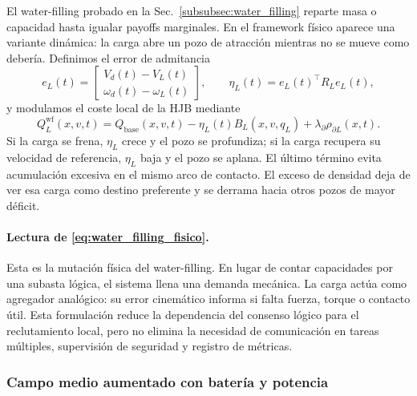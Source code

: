 El water-filling probado en la Sec.~\ref{subsubsec:water_filling} reparte masa o
capacidad hasta igualar payoffs marginales. En el framework físico aparece una variante
dinámica: la carga abre un pozo de atracción mientras no se mueve como debería. Definimos
el error de admitancia
\begin{equation}
  e_L(t)=
  \begin{bmatrix}
    V_d(t)-V_L(t)\\
    \omega_d(t)-\omega_L(t)
  \end{bmatrix},
  \qquad
  \eta_L(t)=e_L(t)^\top R_L e_L(t),
  \label{eq:error_admitancia_water}
\end{equation}
y modulamos el coste local de la HJB mediante
\begin{equation}
  Q_L^{\mathrm{wf}}(x,v,t)
  =
  Q_{\mathrm{base}}(x,v,t)
  -
  \eta_L(t)B_L(x,v,q_L)
  +
  \lambda_\partial\rho_{\partial L}(x,t).
  \label{eq:water_filling_fisico}
\end{equation}
Si la carga se frena, $\eta_L$ crece y el pozo se profundiza; si la carga recupera su
velocidad de referencia, $\eta_L$ baja y el pozo se aplana. El último término evita
acumulación excesiva en el mismo arco de contacto. El exceso de densidad deja de ver esa
carga como destino preferente y se derrama hacia otros pozos de mayor déficit.

\paragraph{Lectura de \eqref{eq:water_filling_fisico}.}
Esta es la mutación física del water-filling. En lugar de contar capacidades por una
subasta lógica, el sistema llena una demanda mecánica. La carga actúa como agregador
analógico: su error cinemático informa si falta fuerza, torque o contacto útil. Esta
formulación reduce la dependencia del consenso lógico para el reclutamiento local, pero
no elimina la necesidad de comunicación en tareas múltiples, supervisión de seguridad y
registro de métricas.

\subsubsection{Campo medio aumentado con batería y potencia}

